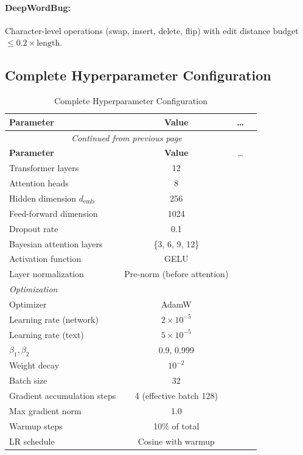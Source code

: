\documentclass[12pt,a4paper]{article}
\theoremstyle{definition}
\begin{document}
\paragraph{DeepWordBug:}
Character-level operations (swap, insert, delete, flip) with edit distance budget $\leq 0.2 \times \text{length}$.

\subsection{Complete Hyperparameter Configuration}

\begin{longtable}{lccc}
\caption{Complete Hyperparameter Configuration}\label{tab:hparam}\\
\toprule
\textbf{Parameter} & \textbf{Value} & …\\
\midrule
\endfirsthead
\multicolumn{3}{c}{\textit{Continued from previous page}}\\
\toprule
\textbf{Parameter} & \textbf{Value} & …\\
\midrule
\endhead
\bottomrule
\endfoot
\bottomrule
\endlastfoot
Transformer layers & 12 \\
Attention heads & 8 \\
Hidden dimension $d_{\text{emb}}$ & 256 \\
Feed-forward dimension & 1024 \\
Dropout rate & 0.1 \\
Bayesian attention layers & \{3, 6, 9, 12\} \\
Activation function & GELU \\
Layer normalization & Pre-norm (before attention) \\
\midrule
\multicolumn{2}{l}{\textit{Optimization}} \\
Optimizer & AdamW \citep{loshchilov2018decoupled} \\
Learning rate (network) & $2 \times 10^{-5}$ \\
Learning rate (text) & $5 \times 10^{-5}$ \\
$\beta_1, \beta_2$ & 0.9, 0.999 \\
Weight decay & $10^{-2}$ \\
Batch size & 32 \\
Gradient accumulation steps & 4 (effective batch 128) \\
Max gradient norm & 1.0 \\
Warmup steps & 10\% of total \\
LR schedule & Cosine with warmup \\

\end{longtable}
\end{document}
